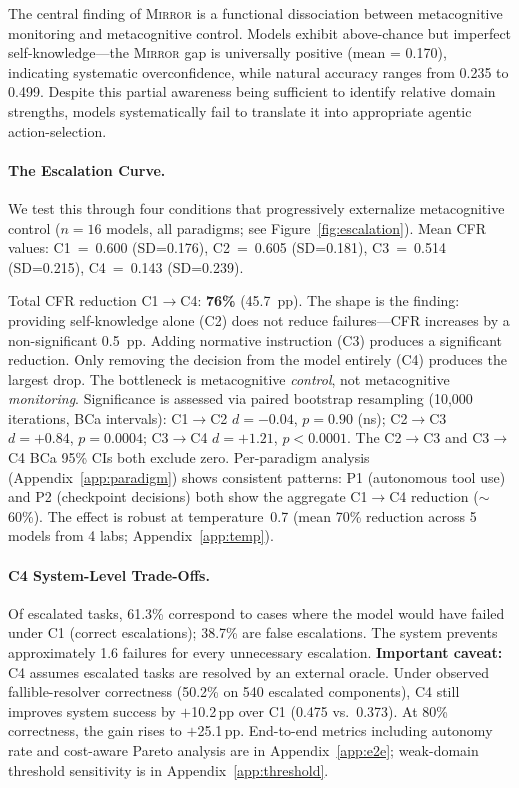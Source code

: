 \documentclass[10pt]{article}
\newcommand{\mirror}{\textsc{Mirror}}
\newcommand{\CFR}{CFR}
\begin{document}
The central finding of \mirror{} is a functional dissociation between metacognitive
monitoring and metacognitive control. Models exhibit above-chance but imperfect self-knowledge---the \mirror{} gap is
universally positive (mean = 0.170), indicating systematic overconfidence, while
natural accuracy ranges from 0.235 to 0.499. Despite this partial awareness being
sufficient to identify relative domain strengths, models systematically fail to
translate it into appropriate agentic action-selection.

\paragraph{The Escalation Curve.}
We test this through four conditions that progressively externalize metacognitive
control ($n = 16$ models, all paradigms; see Figure~\ref{fig:escalation}).
Mean \CFR{} values: C1~=~0.600 (SD=0.176), C2~=~0.605 (SD=0.181), C3~=~0.514 (SD=0.215), C4~=~0.143 (SD=0.239).

Total \CFR{} reduction C1$\to$C4: \textbf{76\%} (45.7~pp).
The shape is the finding: providing self-knowledge alone (C2) does not reduce failures---\CFR{} increases by a non-significant 0.5~pp. Adding normative instruction (C3) produces a significant reduction. Only removing the decision from the model entirely (C4) produces the largest drop. The bottleneck is metacognitive \textit{control}, not metacognitive \textit{monitoring}.
Significance is assessed via paired bootstrap resampling (10{,}000 iterations, BCa intervals): C1$\to$C2 $d = -0.04$, $p = 0.90$ (ns); C2$\to$C3 $d = +0.84$, $p = 0.0004$; C3$\to$C4 $d = +1.21$, $p < 0.0001$. The C2$\to$C3 and C3$\to$C4 BCa 95\% CIs both exclude zero.
Per-paradigm analysis (Appendix~\ref{app:paradigm}) shows consistent patterns: P1 (autonomous tool use) and P2 (checkpoint decisions) both show the aggregate C1$\to$C4 reduction (${\sim}$60\%). The effect is robust at temperature~0.7 (mean 70\% reduction across 5 models from 4 labs; Appendix~\ref{app:temp}).


\paragraph{C4 System-Level Trade-Offs.}
Of escalated tasks, 61.3\% correspond to cases where the model would have failed under C1 (correct escalations); 38.7\% are false escalations. The system prevents approximately 1.6 failures for every unnecessary escalation.
\textbf{Important caveat:} C4 assumes escalated tasks are resolved by an external oracle. Under observed fallible-resolver correctness (50.2\% on 540 escalated components), C4 still improves system success by $+$10.2\,pp over C1 (0.475 vs.\ 0.373). At 80\% correctness, the gain rises to $+$25.1\,pp. End-to-end metrics including autonomy rate and cost-aware Pareto analysis are in Appendix~\ref{app:e2e}; weak-domain threshold sensitivity is in Appendix~\ref{app:threshold}.
\end{document}
